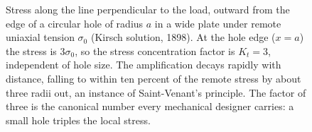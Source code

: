 \begin{figure}[htbp]
\centering
{}
\caption[Stress concentration at a circular hole]{Stress along the
line perpendicular to the load, outward from the edge of a circular
hole of radius $a$ in a wide plate under remote uniaxial tension
$\sigma_0$ (Kirsch solution, 1898). At the hole edge ($x=a$) the
stress is $3\sigma_0$, so the stress concentration factor is $K_t=3$,
independent of hole size. The amplification decays rapidly with
distance, falling to within ten percent of the remote stress by about
three radii out, an instance of Saint-Venant's principle. The factor
of three is the canonical number every mechanical designer carries:
a small hole triples the local stress.}
\label{fig:vol03ch03:stress-concentration-hole}
\end{figure}
